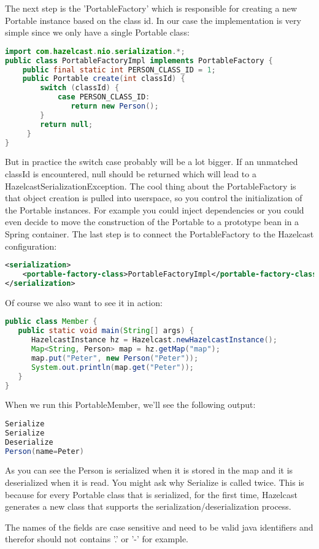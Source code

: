 The next step is the 'PortableFactory' which is responsible for creating a new Portable instance based on the class id. In our case the implementation is very simple since we only have a single Portable class:
\begin{lstlisting}[language=java]
import com.hazelcast.nio.serialization.*;
public class PortableFactoryImpl implements PortableFactory {
    public final static int PERSON_CLASS_ID = 1;
    public Portable create(int classId) {
        switch (classId) {
            case PERSON_CLASS_ID: 
               return new Person();
        }
        return null;
     }
}
\end{lstlisting}
But in practice the switch case probably will be a lot bigger. If an unmatched classId is encountered, null should be returned which will lead to a HazelcastSerializationException. The cool thing about the PortableFactory is that object creation is pulled into userspace, so you control the initialization of the Portable instances. For example you could inject dependencies or you could even decide to move the construction of the Portable to a prototype bean in a Spring container. The last step is to connect the PortableFactory to the Hazelcast configuration:
\begin{lstlisting}[language=xml]
<serialization>
    <portable-factory-class>PortableFactoryImpl</portable-factory-class>
</serialization>
\end{lstlisting}
Of course we also want to see it in action:
\begin{lstlisting}[language=java]
public class Member {
   public static void main(String[] args) {
      HazelcastInstance hz = Hazelcast.newHazelcastInstance();
      Map<String, Person> map = hz.getMap("map");
      map.put("Peter", new Person("Peter"));
      System.out.println(map.get("Peter"));
   }
}
\end{lstlisting}
When we run this PortableMember, we'll see the following output:
\begin{lstlisting}[language=java]
Serialize
Serialize
Deserialize
Person(name=Peter)
\end{lstlisting}
As you can see the Person is serialized when it is stored in the map and it is deserialized when it is read. You might ask why Serialize is called twice. This is because for every Portable class that is serialized, for the first time, Hazelcast generates a new class that supports the serialization/deserialization process. 

The names of the fields are case sensitive and need to be valid java identifiers and therefor should not contains '.' or '-' for example. 


